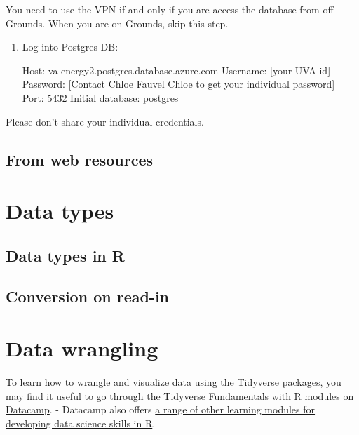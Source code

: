 \documentclass[
]{book}
\begin{document}
You need to use the VPN if and only if you are access the database from off-Grounds. When you are on-Grounds, skip this step.

\begin{enumerate}
\def\labelenumi{(\arabic{enumi})}
\setcounter{enumi}{2}
\item
  Log into Postgres DB:

  Host: va-energy2.postgres.database.azure.com
  Username: {[}your UVA id{]}\citet{va-energy2}
  Password: {[}Contact Chloe Fauvel Chloe to get your individual password{]}
  Port: 5432
  Initial database: postgres
\end{enumerate}

Please don't share your individual credentials.

\hypertarget{from-web-resources}{%
\subsection{From web resources}\label{from-web-resources}}

\hypertarget{data-types}{%
\section{Data types}\label{data-types}}

\hypertarget{data-types-in-r}{%
\subsection{Data types in R}\label{data-types-in-r}}

\hypertarget{conversion-on-read-in}{%
\subsection{Conversion on read-in}\label{conversion-on-read-in}}

\hypertarget{data-wrangling}{%
\section{Data wrangling}\label{data-wrangling}}

To learn how to wrangle and visualize data using the Tidyverse packages, you may find it useful to go through the \href{https://learn.datacamp.com/skill-tracks/tidyverse-fundamentals}{Tidyverse Fundamentals with R} modules on \href{https://learn.datacamp.com/}{Datacamp}.
- Datacamp also offers \href{https://learn.datacamp.com/career-tracks/data-scientist-with-r}{a range of other learning modules for developing data science skills in R}.
\end{document}
